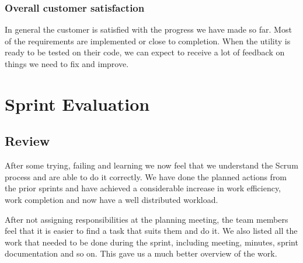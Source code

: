 \subsubsection{Overall customer satisfaction}

In general the customer is satisfied with the progress we have made so far. Most of the requirements are
implemented or close to completion. When the \gls{utility} is ready to be tested on their code, we can expect to receive
a lot of feedback on things we need to fix and improve.

\section{Sprint Evaluation}

\subsection{Review}
After some trying, failing and learning we now feel that we understand the Scrum process and are able to do it correctly. We have done the planned actions from the prior sprints and have achieved a considerable increase in work efficiency, work completion and now have a well distributed workload.

After not assigning responsibilities at the planning meeting, the team members feel that it is easier to find a task that suits them and do it. We also listed all the work that needed to be done during the sprint, including meeting, minutes, sprint documentation and so on. This gave us a much better overview of the work.

